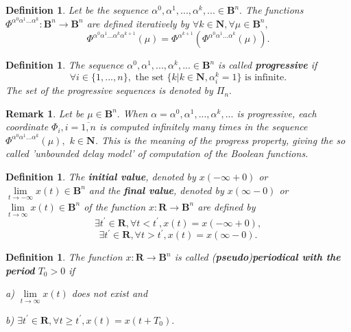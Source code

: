 \documentclass[12pt]{article}\usepackage{amsmath}
\newtheorem{definition}[theorem]{Definition}
\newtheorem{remark}[theorem]{Remark}
\begin{document}
\begin{definition}
Let be the sequence $\alpha^{0},\alpha^{1},...,\alpha^{k},...\in\mathbf{B}^{n}.$ The functions $\Phi^{\alpha^{0}\alpha^{1}...\alpha^{k}}:\mathbf{B}^{n}\rightarrow\mathbf{B}^{n}$ are defined iteratively by $\forall
k\in\mathbf{N},\forall\mu\in\mathbf{B}^{n},$\[
\Phi^{\alpha^{0}\alpha^{1}...\alpha^{k}\alpha^{k+1}}(\mu)=\Phi^{\alpha^{k+1}}(\Phi^{\alpha^{0}\alpha^{1}...\alpha^{k}}(\mu)).
\]

\end{definition}

\begin{definition}
The sequence $\alpha^{0},\alpha^{1},...,\alpha^{k},...\in\mathbf{B}^{n}$ is
called \textbf{progressive} if\[
\forall i\in\{1,...,n\},\text{ the set }\{k|k\in\mathbf{N},\alpha_{i}^{k}=1\}\text{ is infinite.}\]
The set of the progressive sequences is denoted by $\Pi_{n}.$
\end{definition}

\begin{remark}
Let be $\mu\in\mathbf{B}^{n}.$ When $\alpha=\alpha^{0},\alpha^{1},...,\alpha^{k},...$ is progressive, each coordinate $\Phi_{i},i=\overline
{1,n}$ is computed infinitely many times in the sequence $\Phi^{\alpha
^{0}\alpha^{1}...\alpha^{k}}(\mu),$ $k\in\mathbf{N}$. This is the meaning of
the progress property, giving the so called 'unbounded delay model' of
computation of the Boolean functions.
\end{remark}

\begin{definition}
The \textbf{initial value}, denoted by $x(-\infty+0)$ or $\underset
{t\rightarrow-\infty}{\lim}x(t)\in\mathbf{B}^{n}$ and the \textbf{final
value}, denoted by $x(\infty-0)$ or $\underset{t\rightarrow\infty}{\lim
}x(t)\in\mathbf{B}^{n}$ of the function $x:\mathbf{R}\rightarrow\mathbf{B}^{n}$ are defined by\[
\exists t^{\prime}\in\mathbf{R},\forall t<t^{\prime},x(t)=x(-\infty+0),
\]\[
\exists t^{\prime}\in\mathbf{R},\forall t>t^{\prime},x(t)=x(\infty-0).
\]

\end{definition}

\begin{definition}
The function $x:\mathbf{R}\rightarrow\mathbf{B}^{n}$ is called
(\textbf{pseudo})\textbf{periodical with the period} $T_{0}>0$ if

a) $\underset{t\rightarrow\infty}{\lim}x(t)$ does not exist and

b) $\exists t^{\prime}\in\mathbf{R},\forall t\geq t^{\prime},x(t)=x(t+T_{0}).$
\end{definition}
\end{document}
